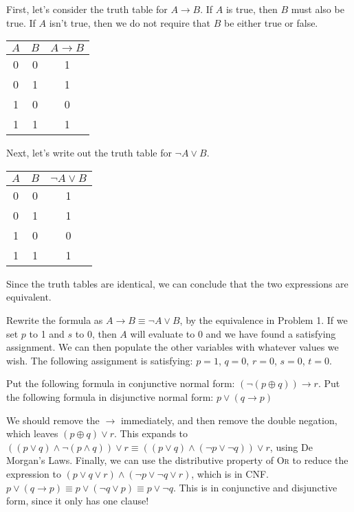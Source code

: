 \documentclass[solution, letterpaper]{cs20inclass}
\begin{document}
\begin{solution}

\subsolution
  First, let's consider the truth table for $A \rightarrow B$. If $A$ is true, then $B$ must also be true. If $A$ isn't true, then we do not require that $B$ be either true or false.
  \begin{center}
    \begin{tabular}{|c|c|c|}\hline
      $A$ & $B$ & $A \rightarrow B$ \\\hline
      0 & 0 & 1 \\
      0 & 1 & 1 \\
      1 & 0 & 0 \\
      1 & 1 & 1 \\\hline
    \end{tabular}
  \end{center}
  
  Next, let's write out the truth table for $\lnot A \lor B$.
  \begin{center}
    \begin{tabular}{|c|c|c|}\hline
      $A$ & $B$ & $\lnot A \lor B$ \\\hline
      0 & 0 & 1 \\
      0 & 1 & 1 \\
      1 & 0 & 0 \\
      1 & 1 & 1 \\\hline
    \end{tabular}
  \end{center}
  
  Since the truth tables are identical, we can conclude that the two expressions are equivalent.

\subsolution Rewrite the formula as $A \rightarrow B \equiv \lnot A \lor B$, by the equivalence in Problem 1. If we set $p$ to 1 and $s$ to 0, then $A$ will evaluate to 0 and we have found a satisfying assignment. We can then populate the other variables with whatever values we wish. The following assignment is satisfying: $p = 1$, $q = 0$, $r = 0$, $s = 0$, $t = 0$.

\end{solution}

\problem

\subproblem Put the following formula in conjunctive normal form: $(\lnot (p \oplus q)) \rightarrow r$.
\subproblem Put the following formula in disjunctive normal form: $p \lor (q \rightarrow p)$

\begin{solution}
\subsolution We should remove the $\rightarrow$ immediately, and then remove the double negation, which leaves $(p \oplus q) \lor r$. This expands to $((p \lor q) \land \lnot (p \land q)) \lor r \equiv ((p \lor q) \land (\lnot p \lor \lnot q)) \lor r$, using De Morgan's Laws. Finally, we can use the distributive property of \textsc{Or} to reduce the expression to $(p \lor q \lor r) \land (\lnot p \lor \lnot q \lor r)$, which is in CNF.
\subsolution $p \lor (q \rightarrow p) \equiv p \lor (\lnot q \lor p) \equiv p \lor \lnot q$. This is in conjunctive and disjunctive form, since it only has one clause!
\end{solution}
\end{document}
